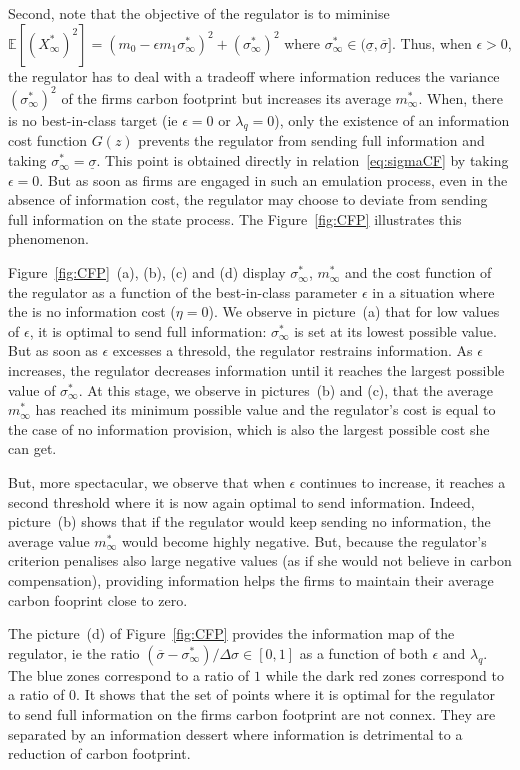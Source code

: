 \documentclass[a4paper,10pt]{article}
\newcommand{\EE}{\mathbb{E}}
\theoremstyle{definition}
\theoremstyle{plain}
\numberwithin{equation}{section}
\begin{document}
Second, note that the objective of the regulator is to miminise $\EE[(X_\infty^\ast)^2] = (m_0 - \epsilon m_1 \sigma^\ast_\infty)^2 + (\sigma^\ast_\infty)^2$ where $\sigma^\ast_\infty \in (\underline{\sigma}, \overline\sigma]$. Thus, when $\epsilon>0$, the regulator has to deal with a tradeoff where information reduces the variance $(\sigma_\infty^\ast)^2$ of the firms carbon footprint but increases its average $m_\infty^\ast$. When, there is no best-in-class target (ie $\epsilon =0$ or $\lambda_q=0$), only the existence of an information cost function $G(z)$ prevents the regulator from sending full information and taking $\sigma_\infty^\ast = \underline{\sigma}$. This point is obtained directly in relation~\eqref{eq:sigmaCF} by taking $\epsilon=0$.  But as soon as firms are engaged in such an emulation process, even in the absence of information cost, the regulator may choose to deviate from sending full information on the state process. The Figure~\ref{fig:CFP} illustrates this phenomenon.

\medskip

Figure~\ref{fig:CFP}~(a), (b), (c) and (d) display $\sigma_\infty^\ast$, $m_\infty^\ast$ and the cost function of the regulator as a function of the best-in-class parameter $\epsilon$ in a situation where the is no information cost ($\eta=0$). We observe in picture~(a) that for low values of $\epsilon$, it is optimal to send full information: $\sigma^\ast_\infty$ is set at its lowest possible value. But as soon as $\epsilon$ excesses a thresold, the regulator restrains information. As $\epsilon$ increases, the regulator decreases information until it reaches the largest possible value of $\sigma^\ast_\infty$. At this stage, we observe in pictures~(b) and (c), that the average $m^\ast_\infty$ has reached its minimum possible value and the regulator's cost is equal to the case of no information provision, which is also the largest possible cost she can get.

But, more spectacular, we observe that when $\epsilon$ continues to increase, it reaches a second threshold where it is now again optimal to send information. Indeed, picture~(b) shows that if the regulator would keep sending no information, the average value $m^\ast_\infty$ would become highly negative. But, because the regulator's criterion penalises also large negative values (as if she would not believe in carbon compensation), providing information helps the firms to maintain their average carbon fooprint close to zero.

The picture~(d) of Figure~\ref{fig:CFP} provides the information map of the regulator, ie the ratio $(\overline\sigma-\sigma^\ast_\infty)/\Delta\sigma \in [0,1]$ as a function of both $\epsilon$ and $\lambda_q$.  The blue zones correspond to a ratio of $1$ while the dark red zones correspond to a ratio of $0$. It shows that the set of points where it is optimal for the regulator to send full information on the firms carbon footprint are not connex. They are separated by an information dessert where information is detrimental to a reduction of carbon footprint.
\end{document}
